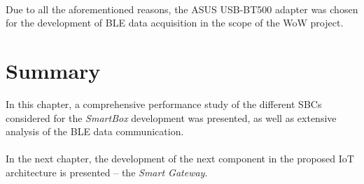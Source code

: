 \paragraph{} Due to all the aforementioned reasons, the ASUS USB-BT500 adapter was chosen for the development of \acs{BLE} data acquisition in the scope of the \acs{WoW} project.

\section{Summary}
In this chapter, a comprehensive performance study of the different \acs{SBC}s considered for the \textit{SmartBox} development was presented, as well as extensive analysis of the \acs{BLE} data communication.

\paragraph{} In the next chapter, the development of the next component in the proposed \acs{IoT} architecture is presented -- the \textit{Smart Gateway}.